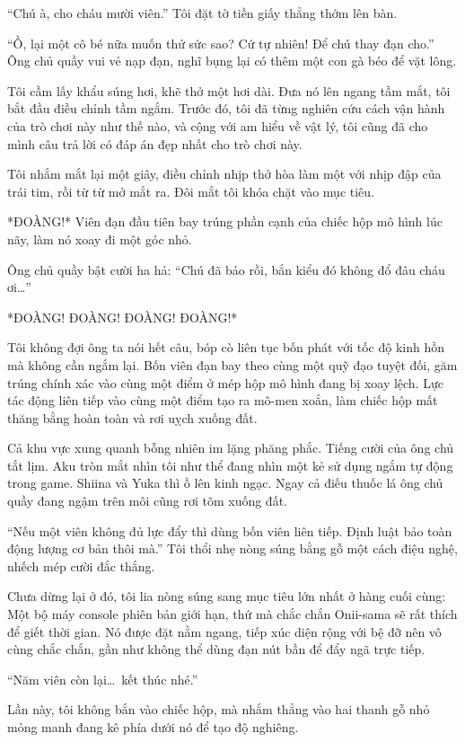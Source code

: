 \documentclass[../main.tex]{subfiles}
\begin{document}
``Chú à, cho cháu mười viên.'' Tôi đặt tờ tiền giấy thẳng thớm lên bàn.

``Ồ, lại một cô bé nữa muốn thử sức sao? Cứ tự nhiên! Để chú thay đạn cho.'' Ông chủ quầy vui vẻ nạp đạn, nghĩ bụng lại có thêm một con gà béo để vặt lông.

Tôi cầm lấy khẩu súng hơi, khẽ thở một hơi dài. Đưa nó lên ngang tầm mắt, tôi bắt đầu điều chỉnh tầm ngắm. Trước đó, tôi đã từng nghiên cứu cách vận hành của trò chơi này như thế nào, và cộng với am hiểu về vật lý, tôi cũng đã cho mình câu trả lời có đáp án đẹp nhất cho trò chơi này.

Tôi nhắm mắt lại một giây, điều chỉnh nhịp thở hòa làm một với nhịp đập của trái tim, rồi từ từ mở mắt ra. Đôi mắt tôi khóa chặt vào mục tiêu.

*ĐOÀNG!* Viên đạn đầu tiên bay trúng phần cạnh của chiếc hộp mô hình lúc nãy, làm nó xoay đi một góc nhỏ.

Ông chủ quầy bật cười ha hả: ``Chú đã bảo rồi, bắn kiểu đó không đổ đâu cháu ơi\dots''

*ĐOÀNG! ĐOÀNG! ĐOÀNG! ĐOÀNG!*

Tôi không đợi ông ta nói hết câu, bóp cò liên tục bốn phát với tốc độ kinh hồn mà không cần ngắm lại. Bốn viên đạn bay theo cùng một quỹ đạo tuyệt đối, găm trúng chính xác vào cùng một điểm ở mép hộp mô hình đang bị xoay lệch. Lực tác động liên tiếp vào cùng một điểm tạo ra mô-men xoắn, làm chiếc hộp mất thăng bằng hoàn toàn và rơi uỵch xuống đất.

Cả khu vực xung quanh bỗng nhiên im lặng phăng phắc. Tiếng cười của ông chủ tắt lịm. Aku tròn mắt nhìn tôi như thể đang nhìn một kẻ sử dụng ngắm tự động trong game. Shiina và Yuka thì ồ lên kinh ngạc. Ngay cả điếu thuốc lá ông chủ quầy đang ngậm trên môi cũng rơi tõm xuống đất.

``Nếu một viên không đủ lực đẩy thì dùng bốn viên liên tiếp. Định luật bảo toàn động lượng cơ bản thôi mà.'' Tôi thổi nhẹ nòng súng bằng gỗ một cách điệu nghệ, nhếch mép cười đắc thắng.

Chưa dừng lại ở đó, tôi lia nòng súng sang mục tiêu lớn nhất ở hàng cuối cùng: Một bộ máy console phiên bản giới hạn, thứ mà chắc chắn Onii-sama sẽ rất thích để giết thời gian. Nó được đặt nằm ngang, tiếp xúc diện rộng với bệ đỡ nên vô cùng chắc chắn, gần như không thể dùng đạn nút bần để đẩy ngã trực tiếp.

``Năm viên còn lại\dots\ kết thúc nhé.''

Lần này, tôi không bắn vào chiếc hộp, mà nhắm thẳng vào hai thanh gỗ nhỏ mỏng manh đang kê phía dưới nó để tạo độ nghiêng.
\end{document}
